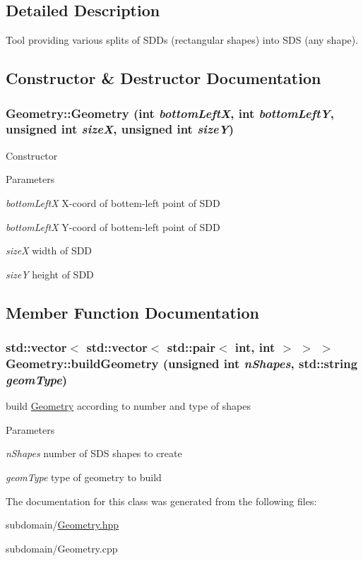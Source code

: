 \subsection{Detailed Description}
Tool providing various splits of SDDs (rectangular shapes) into SDS (any shape). 

\subsection{Constructor \& Destructor Documentation}
\hypertarget{classGeometry_ac7e6a2114a9969257aa18147575cd2fb}{
\subsubsection[{Geometry}]{\setlength{\rightskip}{0pt plus 5cm}Geometry::Geometry (int {\em bottomLeftX}, \/  int {\em bottomLeftY}, \/  unsigned int {\em sizeX}, \/  unsigned int {\em sizeY})}}
\label{classGeometry_ac7e6a2114a9969257aa18147575cd2fb}
Constructor


\begin{DoxyParams}{Parameters}
\item[{\em bottomLeftX}]X-\/coord of bottem-\/left point of SDD \item[{\em bottomLeftX}]Y-\/coord of bottem-\/left point of SDD \item[{\em sizeX}]width of SDD \item[{\em sizeY}]height of SDD \end{DoxyParams}


\subsection{Member Function Documentation}
\hypertarget{classGeometry_a64fa42fab5fe0c5e9bb7d960bafa55fd}{
\subsubsection[{buildGeometry}]{\setlength{\rightskip}{0pt plus 5cm}std::vector$<$ std::vector$<$ std::pair$<$ int, int $>$ $>$ $>$ Geometry::buildGeometry (unsigned int {\em nShapes}, \/  std::string {\em geomType})}}
\label{classGeometry_a64fa42fab5fe0c5e9bb7d960bafa55fd}
build \hyperlink{classGeometry}{Geometry} according to number and type of shapes


\begin{DoxyParams}{Parameters}
\item[{\em nShapes}]number of SDS shapes to create \item[{\em geomType}]type of geometry to build \end{DoxyParams}


The documentation for this class was generated from the following files:\begin{DoxyCompactItemize}
\item 
subdomain/\hyperlink{Geometry_8hpp}{Geometry.hpp}\item 
subdomain/Geometry.cpp\end{DoxyCompactItemize}
